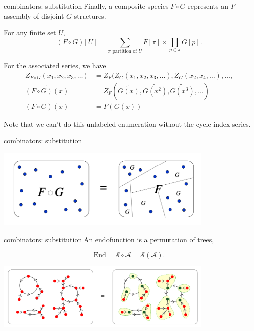 \documentclass{beamer}
\begin{document}
\begin{frame}{combinators: substitution}
  Finally, a composite species $F\circ G$ represents an $F$-assembly of disjoint $G$-structures. \pause

  For any finite set $U$,
  \[
    (F\circ G)[U] = \sum_{\text{$\pi$ partition of $U$}} F[\pi] \times \prod_{p\in \pi} G[p].
  \] \pause

  For the associated series, we have
  \begin{align*}
    Z_{F\circ G}(x_1,x_2,x_3,\ldots) & = Z_F(Z_G(x_1,x_2,x_3,\ldots),Z_G(x_2,x_4,\ldots),\ldots,             \\
    \widetilde{(F\circ G)(x)}        & = Z_F(\widetilde{G(x)}, \widetilde{G(x^2)},\widetilde{G(x^3)},\ldots) \\
    (F\circ G)(x)                    & = F(G(x))
  \end{align*} \pause

  Note that we can't do this unlabeled enumeration without the cycle index series.

\end{frame}

\begin{frame}{combinators: substitution}
  \begin{center}
    \includegraphics[width=10.5cm]{figures/substitution.png}
  \end{center}
\end{frame}

\begin{frame}{combinators: substitution}
  An endofunction is a permutation of trees,

  \[
    \mathrm{End} = \mathcal S \circ \mathcal A = \mathcal S(\mathcal A).
  \]

  \begin{center}
    \includegraphics[width=10.5cm]{figures/endofunction.png}
  \end{center}
\end{frame}
\end{document}
